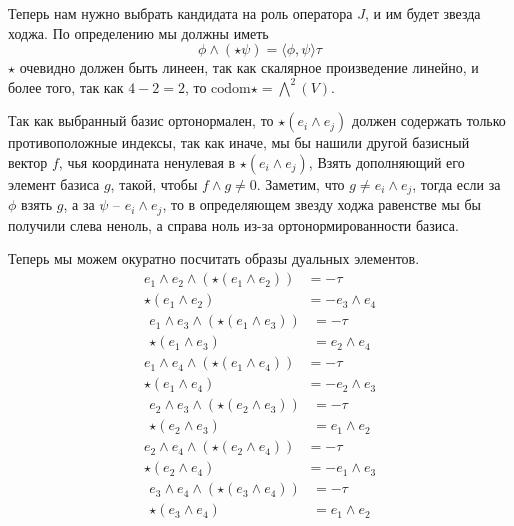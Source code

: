 \documentclass{article}
\begin{document}
\begin{enumerate}
        Теперь нам нужно выбрать кандидата на роль оператора $J$, и им будет
        звезда ходжа. По определению мы должны иметь
        \[\phi\wedge(\star\psi)=\langle\phi,\psi\rangle\tau\]
        $\star$ очевидно должен быть линеен, так как скалярное произведение
        линейно, и более того, так как $4-2=2$, то $\text{codom}\star=\bigwedge^2(V)$.

        Так как выбранный базис ортонормален, то $\star(e_i\wedge e_j)$ должен
        содержать только противоположные индексы, так как иначе, мы бы нашили
        другой базисный вектор $f$, чья координата ненулевая в $\star(e_i\wedge e_j)$,
        Взять дополняющий его элемент базиса $g$, такой, чтобы $f\wedge g\neq 0$.
        Заметим, что $g\neq e_i\wedge e_j$, тогда если за $\phi$ взять $g$,
        а за $\psi$ – $e_i\wedge e_j$, то в определяющем звезду ходжа равенстве
        мы бы получили слева неноль, а справа ноль из-за ортонормированности
        базиса.

        Теперь мы можем окуратно посчитать образы дуальных элементов.
        \begin{align*}
            e_1\wedge e_2\wedge(\star(e_1\wedge e_2))&=-\tau\\
            \star(e_1\wedge e_2)&=-e_3\wedge e_4
        \end{align*}
        \begin{align*}
            e_1\wedge e_3\wedge(\star(e_1\wedge e_3))&=-\tau\\
            \star(e_1\wedge e_3)&=e_2\wedge e_4
        \end{align*}
        \begin{align*}
            e_1\wedge e_4\wedge(\star(e_1\wedge e_4))&=-\tau\\
            \star(e_1\wedge e_4)&=-e_2\wedge e_3
        \end{align*}
        \begin{align*}
            e_2\wedge e_3\wedge(\star(e_2\wedge e_3))&=-\tau\\
            \star(e_2\wedge e_3)&=e_1\wedge e_2
        \end{align*}
        \begin{align*}
            e_2\wedge e_4\wedge(\star(e_2\wedge e_4))&=-\tau\\
            \star(e_2\wedge e_4)&=-e_1\wedge e_3
        \end{align*}
        \begin{align*}
            e_3\wedge e_4\wedge(\star(e_3\wedge e_4))&=-\tau\\
            \star(e_3\wedge e_4)&=e_1\wedge e_2
        \end{align*}


\end{enumerate}
\end{document}
